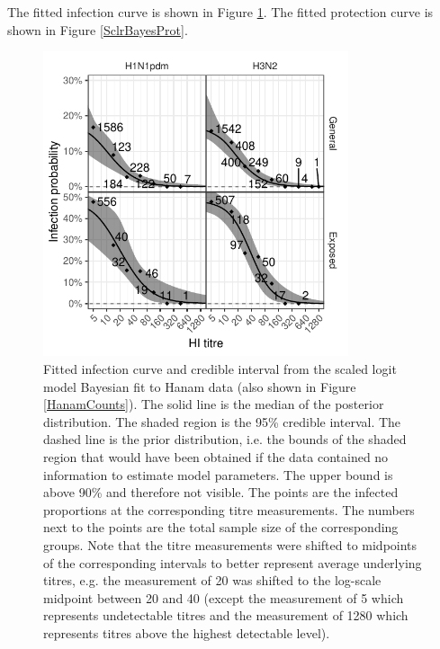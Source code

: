 \documentclass[12pt]{article}
\begin{document}
The fitted infection curve is shown in Figure \ref{SclrBayesInf}. The fitted protection curve is shown in Figure \ref{SclrBayesProt}.

\begin{figure}[htp]
	\centering
	\includegraphics[width=0.8\textwidth]{../fit-sclr-bayesian-plot/hanam-hi-inf.pdf}
	\caption{
	Fitted infection curve and credible interval from the scaled logit model Bayesian fit to Hanam data (also shown in Figure \ref{HanamCounts}). The solid line is the median of the posterior distribution. The shaded region is the 95\% credible interval. The dashed line is the prior distribution, i.e. the bounds of the shaded region that would have been obtained if the data contained no information to estimate model parameters. The upper bound is above 90\% and therefore not visible. The points are the infected proportions at the corresponding titre measurements. The numbers next to the points are the total sample size of the corresponding groups. Note that the titre measurements were shifted to midpoints of the corresponding intervals to better represent average underlying titres, e.g. the measurement of 20 was shifted to the log-scale midpoint between 20 and 40 (except the measurement of 5 which represents undetectable titres and the measurement of 1280 which represents titres above the highest detectable level).
	}
	\label{SclrBayesInf}
\end{figure}

\pagebreak
\end{document}
